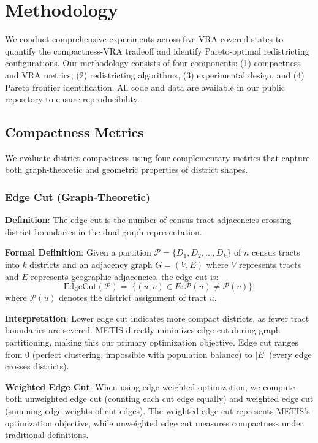 
\section{Methodology}

We conduct comprehensive experiments across five VRA-covered states to quantify the compactness-VRA tradeoff and identify Pareto-optimal redistricting configurations. Our methodology consists of four components: (1) compactness and VRA metrics, (2) redistricting algorithms, (3) experimental design, and (4) Pareto frontier identification. All code and data are available in our public repository to ensure reproducibility.

\subsection{Compactness Metrics}

We evaluate district compactness using four complementary metrics that capture both graph-theoretic and geometric properties of district shapes.

\subsubsection{Edge Cut (Graph-Theoretic)}

\textbf{Definition}: The edge cut is the number of census tract adjacencies crossing district boundaries in the dual graph representation.

\textbf{Formal Definition}: Given a partition $\mathcal{P} = \{D_1, D_2, \ldots, D_k\}$ of $n$ census tracts into $k$ districts and an adjacency graph $G = (V, E)$ where $V$ represents tracts and $E$ represents geographic adjacencies, the edge cut is:
\[
\text{EdgeCut}(\mathcal{P}) = |\{(u, v) \in E : \mathcal{P}(u) \neq \mathcal{P}(v)\}|
\]
where $\mathcal{P}(u)$ denotes the district assignment of tract $u$.

\textbf{Interpretation}: Lower edge cut indicates more compact districts, as fewer tract boundaries are severed. METIS directly minimizes edge cut during graph partitioning, making this our primary optimization objective. Edge cut ranges from 0 (perfect clustering, impossible with population balance) to $|E|$ (every edge crosses districts).

\textbf{Weighted Edge Cut}: When using edge-weighted optimization, we compute both unweighted edge cut (counting each cut edge equally) and weighted edge cut (summing edge weights of cut edges). The weighted edge cut represents METIS's optimization objective, while unweighted edge cut measures compactness under traditional definitions.

